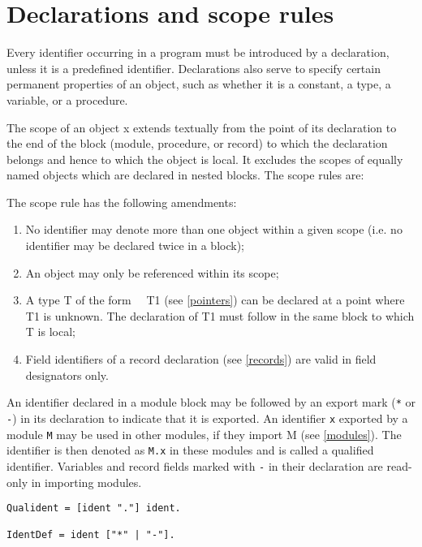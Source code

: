 \documentclass[12pt]{article}
\begin{document}
\section{Declarations and scope rules}
\label{declarations}

Every identifier occurring in a program must be introduced by a declaration, unless it is a predefined identifier. Declarations also serve to specify certain permanent properties of an object, such as whether it is a constant, a type, a variable, or a procedure.

The scope of an object x extends textually from the point of its declaration to the end of the block (module, procedure, or record) to which the declaration belongs and hence to which the object is local. It excludes the scopes of equally named objects which are declared in nested blocks. The scope rules are:

The scope rule has the following amendments:
\begin{enumerate}
    \item No identifier may denote more than one object within a given scope (i.e. no identifier may be declared twice in a block);
    \item An object may only be referenced within its scope;
    \item A type T of the form \POINTER\ \TO\ T1 (see \ref{pointers}) can be declared at a point where T1 is unknown. The declaration of T1 must follow in the same block to which T is local;
    \item Field identifiers of a record declaration (see \ref{records}) are valid in field designators only.
\end{enumerate}

An identifier declared in a module block may be followed by an export mark (\lstinline!*! or \lstinline!-!) in its declaration to indicate that it is exported. An identifier \lstinline!x! exported by a module \lstinline!M! may be used in other modules, if they import M (see \ref{modules}). The identifier is then denoted as \lstinline!M.x! in these modules and is called a qualified identifier. Variables and record fields marked with \lstinline!-! in their declaration are read-only in importing modules.

\begin{lstlisting}[style=ebnf]
Qualident = [ident "."] ident. 

IdentDef = ident ["*" | "-"].
\end{lstlisting}
\end{document}
